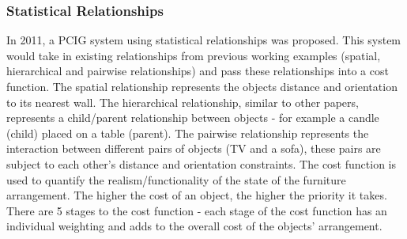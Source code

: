 \subsubsection*{Statistical Relationships}
In 2011, a PCIG system using statistical relationships was proposed\cite{make-it-home}\cite{youtube:make-it-home}. This system would take in existing relationships from previous working examples (spatial, hierarchical and pairwise relationships) and pass these relationships into a cost function. The spatial relationship represents the objects distance and orientation to its nearest wall. The hierarchical relationship, similar to other papers, represents a child/parent relationship between objects - for example a candle (child) placed on a table (parent). The pairwise relationship represents the interaction between different pairs of objects (TV and a sofa), these pairs are subject to each other's distance and orientation constraints.
The cost function is used to quantify the realism/functionality of the state of the furniture arrangement. The higher the cost of an object, the higher the priority it takes. 
There are 5 stages to the cost function - each stage of the cost function has an individual weighting and adds to the overall cost of the objects' arrangement.
